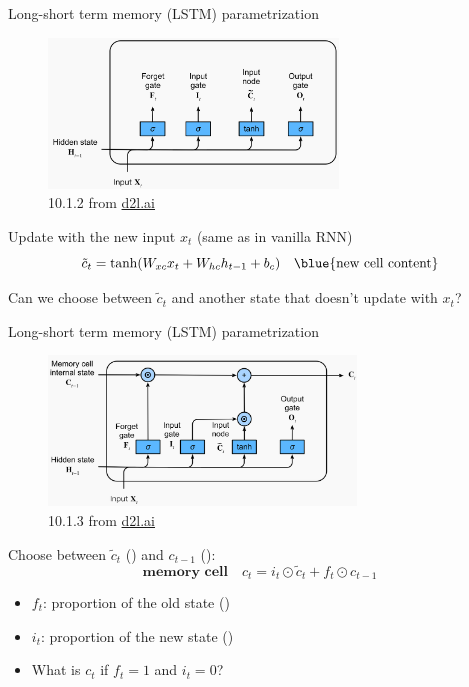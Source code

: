 \documentclass[usenames,dvipsnames,notes,11pt,aspectratio=169,hyperref={colorlinks=true, linkcolor=blue}]{beamer}
\begin{document}
\begin{frame}
    {Long-short term memory (LSTM) parametrization}
    \begin{figure}
        \includegraphics[height=4cm]{figures/lstm-1}
        \caption{10.1.2 from \href{https://d2l.ai/chapter_recurrent-modern/lstm.html}{d2l.ai}}
    \end{figure}

    Update with the new input $x_t$ (same as in vanilla RNN)
    $$
    \tilde{c}_t = \tanh(W_{xc}x_t + W_{hc}h_{t-1} + b_c) \quad \text{\blue{new cell content}}
    $$

    \pause\vspace{-1ex}
    Can we choose between $\tilde{c}_t$ and another state that doesn't update with $x_t$?
\end{frame}

\begin{frame}
    {Long-short term memory (LSTM) parametrization}
    \begin{figure}
        \includegraphics[height=4cm]{figures/lstm-2}
        \caption{10.1.3 from \href{https://d2l.ai/chapter_recurrent-modern/lstm.html}{d2l.ai}}
    \end{figure}
    \vspace{-1em}

    Choose between $\tilde{c}_t$ () and $c_{t-1}$ (): 
    $$
    \textbf{memory cell} \quad
    c_t = i_t \odot \tilde{c}_t + f_t \odot c_{t-1}
    $$

    \vspace{-1ex}
    \begin{itemize}
        \item $f_t$: proportion of the old state ()
        \item $i_t$: proportion of the new state ()
        \item What is $c_t$ if $f_t=1$ and $i_t=0$?
    \end{itemize}
\end{frame}
\end{document}
